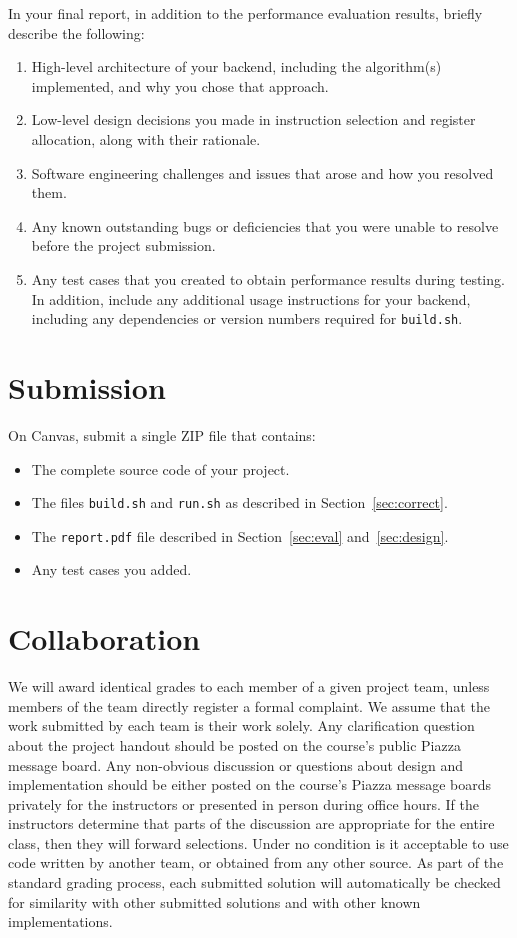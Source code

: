 \documentclass[12pt]{article}
\begin{document}
In your final report, in addition to the performance evaluation results,
briefly describe the following:
%
\begin{enumerate}
\item High-level architecture of your backend, including the
  algorithm(s) implemented, and why you chose that approach.
\item Low-level design decisions you made in instruction selection and register allocation,
    along with their rationale.
\item Software engineering challenges and issues that arose and how
  you resolved them.
\item Any known outstanding bugs or deficiencies that you were unable
  to   resolve before the project submission.
\item Any test cases that you created to obtain performance results during testing. In addition, include any additional usage instructions for your backend, including any dependencies or version numbers required for \texttt{build.sh}.
 \end{enumerate}

\section{Submission}\label{sec:sub}

On Canvas, submit a single ZIP file that contains:
\begin{itemize}
    \item The complete source code of your project.
    \item The files \texttt{build.sh} and \texttt{run.sh} as described in Section~\ref{sec:correct}.
    \item The \texttt{report.pdf} file described in Section~\ref{sec:eval} and~\ref{sec:design}.
    \item Any test cases you added.
\end{itemize}

\section{Collaboration}
%
We will award identical grades to each member of a given project team,
unless members of the team directly register a formal complaint.
%
We assume that the work submitted by each team is their work solely.
% 
Any clarification question about the project handout should be posted
on the course's public Piazza message
board.
%
Any non-obvious discussion or questions about design and
implementation should be either posted on the course's Piazza message
boards privately for the instructors or presented in person during
office hours.
%
If the instructors determine that parts of the discussion are
appropriate for the entire class, then they will forward selections.
%
Under no condition is it acceptable to use code written by another
team, or obtained from any other source.
%
As part of the standard grading process, each submitted solution will
automatically be checked for similarity with other submitted solutions and with other known
implementations.
\end{document}

